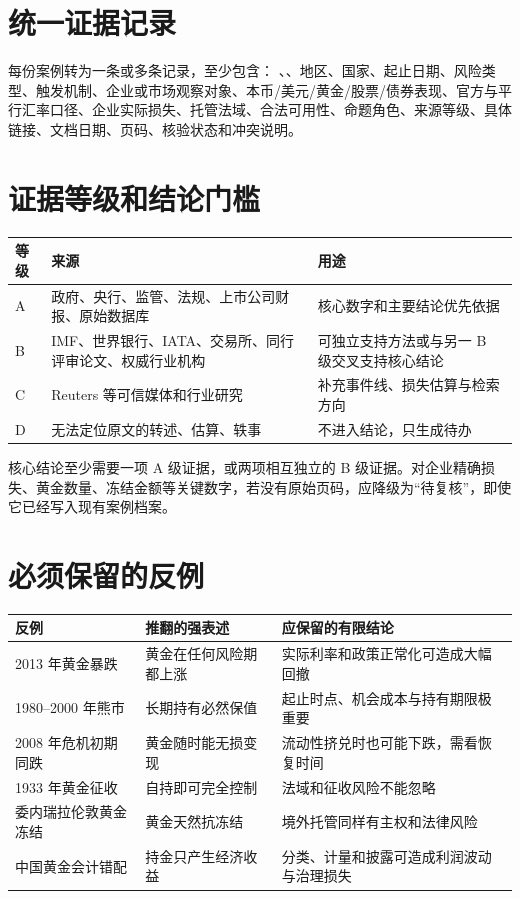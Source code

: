 \documentclass[UTF8,12pt,openany]{ctexbook}
\begin{document}
\section{统一证据记录}
每份案例转为一条或多条记录，至少包含：
、、地区、国家、起止日期、风险类型、触发机制、企业或市场观察对象、本币/美元/黄金/股票/债券表现、官方与平行汇率口径、企业实际损失、托管法域、合法可用性、命题角色、来源等级、具体链接、文档日期、页码、核验状态和冲突说明。

\section{证据等级和结论门槛}
\begin{longtable}{p{1.2cm}p{5.5cm}p{7.0cm}}
\toprule
\textbf{等级} & \textbf{来源} & \textbf{用途}\\
\midrule
A & 政府、央行、监管、法规、上市公司财报、原始数据库 & 核心数字和主要结论优先依据\\
B & IMF、世界银行、IATA、交易所、同行评审论文、权威行业机构 & 可独立支持方法或与另一 B 级交叉支持核心结论\\
C & Reuters 等可信媒体和行业研究 & 补充事件线、损失估算与检索方向\\
D & 无法定位原文的转述、估算、轶事 & 不进入结论，只生成待办\\
\bottomrule
\end{longtable}

核心结论至少需要一项 A 级证据，或两项相互独立的 B 级证据。对企业精确损失、黄金数量、冻结金额等关键数字，若没有原始页码，应降级为“待复核”，即使它已经写入现有案例档案。

\section{必须保留的反例}
\begin{longtable}{p{3.2cm}p{5.0cm}p{5.5cm}}
\toprule
\textbf{反例} & \textbf{推翻的强表述} & \textbf{应保留的有限结论}\\
\midrule
2013 年黄金暴跌 & 黄金在任何风险期都上涨 & 实际利率和政策正常化可造成大幅回撤\\
1980--2000 年熊市 & 长期持有必然保值 & 起止时点、机会成本与持有期限极重要\\
2008 年危机初期同跌 & 黄金随时能无损变现 & 流动性挤兑时也可能下跌，需看恢复时间\\
1933 年黄金征收 & 自持即可完全控制 & 法域和征收风险不能忽略\\
委内瑞拉伦敦黄金冻结 & 黄金天然抗冻结 & 境外托管同样有主权和法律风险\\
中国黄金会计错配 & 持金只产生经济收益 & 分类、计量和披露可造成利润波动与治理损失\\
\bottomrule
\end{longtable}
\end{document}
